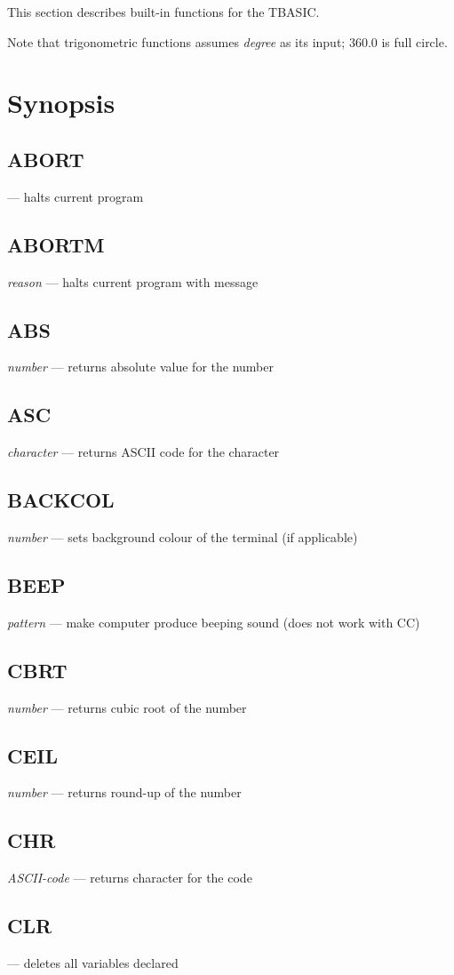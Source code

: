 This section describes built-in functions for the TBASIC.

Note that trigonometric functions assumes \emph{degree} as its input; 360.0 is full circle.

\section{Synopsis}

\subsection{ABORT} --- halts current program
\subsection{ABORTM} \emph{reason} --- halts current program with message
\subsection{ABS} \emph{number} --- returns absolute value for the number
\subsection{ASC} \emph{character} --- returns ASCII code for the character
\subsection{BACKCOL} \emph{number} --- sets background colour of the terminal (if applicable)
\subsection{BEEP} \emph{pattern} --- make computer produce beeping sound (does not work with CC)
\subsection{CBRT} \emph{number} --- returns cubic root of the number
\subsection{CEIL} \emph{number} --- returns round-up of the number
\subsection{CHR} \emph{ASCII-code} --- returns character for the code
\subsection{CLR} --- deletes all variables declared
